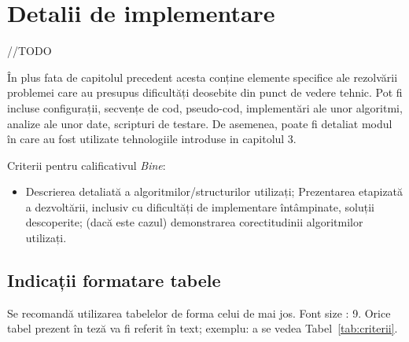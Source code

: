 \documentclass[12pt,a4paper]{report}
\numberwithin{equation}{section} %
\begin{document}
\chapter{\label{sec:implementare}Detalii de implementare}

//TODO

În plus fata de capitolul precedent acesta conține elemente specifice ale rezolvării problemei care au presupus dificultăți deosebite din punct de vedere tehnic. Pot fi incluse configurații, secvențe de cod, pseudo-cod, implementări ale unor algoritmi, analize ale unor date, scripturi de testare. De asemenea, poate fi detaliat modul în care au fost utilizate tehnologiile introduse in capitolul 3.


Criterii pentru calificativul \textit{Bine}:
\begin{itemize}
	\item	Descrierea detaliată a algoritmilor/structurilor utilizați; Prezentarea etapizată a dezvoltării, inclusiv cu dificultăți de implementare întâmpinate, soluții descoperite; (dacă este cazul) demonstrarea corectitudinii algoritmilor utilizați.
\end{itemize}

\section{Indicații formatare tabele}
Se recomandă utilizarea tabelelor de forma celui de mai jos.  Font size :  9.
Orice tabel prezent în teză va fi referit în text; exemplu: a se vedea Tabel~\ref{tab:criterii}.
\end{document}

